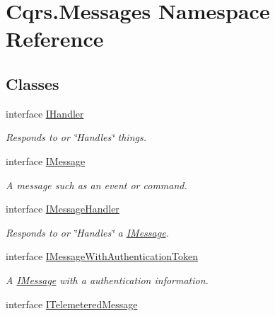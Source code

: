 \hypertarget{namespaceCqrs_1_1Messages}{}\section{Cqrs.\+Messages Namespace Reference}
\label{namespaceCqrs_1_1Messages}
\subsection*{Classes}
\begin{DoxyCompactItemize}
\item 
interface \hyperlink{interfaceCqrs_1_1Messages_1_1IHandler}{I\+Handler}
\begin{DoxyCompactList}\small\item\em Responds to or \char`\"{}\+Handles\char`\"{} things. \end{DoxyCompactList}\item 
interface \hyperlink{interfaceCqrs_1_1Messages_1_1IMessage}{I\+Message}
\begin{DoxyCompactList}\small\item\em A message such as an event or command. \end{DoxyCompactList}\item 
interface \hyperlink{interfaceCqrs_1_1Messages_1_1IMessageHandler}{I\+Message\+Handler}
\begin{DoxyCompactList}\small\item\em Responds to or \char`\"{}\+Handles\char`\"{} a \hyperlink{interfaceCqrs_1_1Messages_1_1IMessage}{I\+Message}. \end{DoxyCompactList}\item 
interface \hyperlink{interfaceCqrs_1_1Messages_1_1IMessageWithAuthenticationToken}{I\+Message\+With\+Authentication\+Token}
\begin{DoxyCompactList}\small\item\em A \hyperlink{interfaceCqrs_1_1Messages_1_1IMessage}{I\+Message} with a authentication information. \end{DoxyCompactList}\item 
interface \hyperlink{interfaceCqrs_1_1Messages_1_1ITelemeteredMessage}{I\+Telemetered\+Message}
\end{DoxyCompactItemize}
